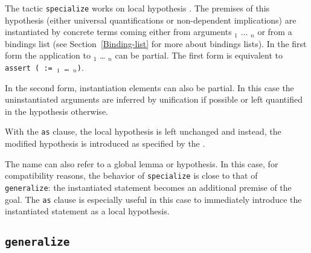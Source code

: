 \begin{coq_example*}
\begin{Variants}
      The tactic {\tt specialize} works on local hypothesis \ident.
      The premises of this hypothesis (either universal
      quantifications or non-dependent implications) are instantiated
      by concrete terms coming either from arguments \term$_1$
      $\ldots$ \term$_n$ or from a bindings list (see
      Section~\ref{Binding-list} for more about bindings lists).
      In the first form the application to \term$_1$ {\ldots}
      \term$_n$ can be partial. The first form is equivalent to
      {\tt assert ({\ident} := {\ident} {\term$_1$} \dots\ \term$_n$)}.

      In the second form, instantiation elements can also be partial.
      In this case the uninstantiated arguments are inferred by
      unification if possible or left quantified in the hypothesis
      otherwise.

      With the {\tt as} clause, the local hypothesis {\ident} is left
      unchanged and instead, the modified hypothesis is introduced as
      specified by the {\intropattern}.

      The name {\ident} can also refer to a global lemma or
      hypothesis. In this case, for compatibility reasons, the
      behavior of {\tt specialize} is close to that of {\tt
        generalize}: the instantiated statement becomes an additional
      premise of the goal. The {\tt as} clause is especially useful
      in this case to immediately introduce the instantiated statement
      as a local hypothesis.

  \begin{ErrMsgs}
  \item {}
  \item {}
  \end{ErrMsgs}


\end{Variants}

\subsection{\tt generalize \term}
\label{generalize}


\end{coq_example*}
